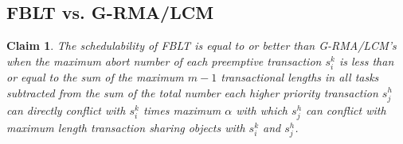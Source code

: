 \documentclass[prodmode,acmtecs]{acmsmall}
\newtheorem{clm}{Claim}
\begin{document}

\subsection{FBLT vs. G-RMA/LCM}

\begin{clm}\label{clm:fblt_lcm_rma}
The schedulability of FBLT is equal to or better than G-RMA/LCM's when the maximum
abort number of each preemptive transaction $s_{i}^{k}$ is less than or equal to the sum of the maximum $m-1$ transactional lengths in all tasks subtracted from the sum of the total number
each higher priority transaction $s_{j}^{h}$ can directly conflict with $s_{i}^{k}$ times maximum $\alpha$ with which $s_{j}^{h}$ can conflict with maximum length transaction sharing objects with $s_{i}^{k}$ and $s_{j}^{h}$.
\end{clm}
\end{document}
